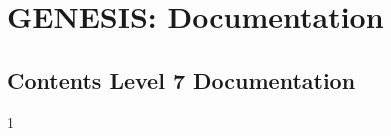 \documentclass[12pt]{article}
\begin{document}
\section*{GENESIS: Documentation}

\subsection*{Contents Level 7 Documentation}

\begin{itemize}

1
\end{itemize}

\end{document}
